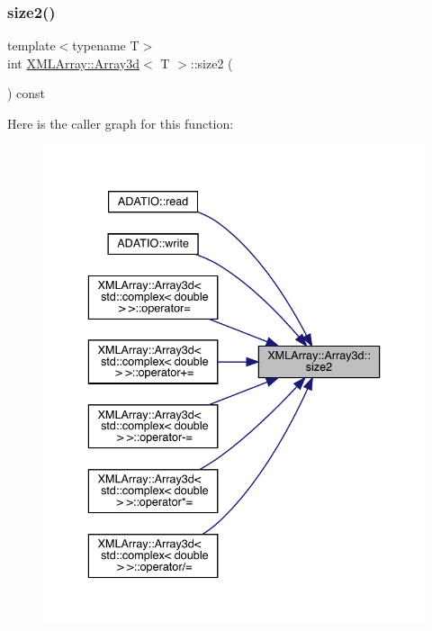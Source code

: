 \subsubsection{\texorpdfstring{size2()}{size2()}\hspace{0.1cm}{\footnotesize\ttfamily [1/2]}}
{\footnotesize\ttfamily template$<$typename T$>$ \\
int \mbox{\hyperlink{classXMLArray_1_1Array3d}{X\+M\+L\+Array\+::\+Array3d}}$<$ T $>$\+::size2 (\begin{DoxyParamCaption}{ }\end{DoxyParamCaption}) const\hspace{0.3cm}{\ttfamily [inline]}}

Here is the caller graph for this function\+:\nopagebreak
\begin{figure}[H]
\begin{center}
\leavevmode
\includegraphics[width=336pt]{db/da0/classXMLArray_1_1Array3d_a1ea00a28e916b3fd9102ce7057c02dac_icgraph}
\end{center}
\end{figure}
\mbox{\label{classXMLArray_1_1Array3d_a1ea00a28e916b3fd9102ce7057c02dac}} 
